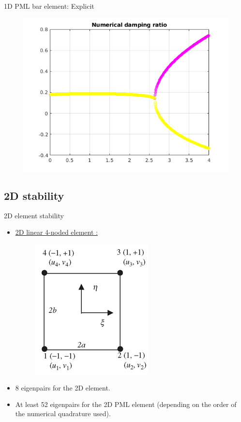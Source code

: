 \begin{frame}{1D PML bar element: Explicit}
\begin{figure}[ht]
\begin{minipage}[b]{0.5\linewidth}
  \end{minipage}%
  \begin{minipage}[b]{0.5\linewidth}
    \centering
    \includegraphics[scale=.35]{images/pml1d-exp-4.png} \\

  \end{minipage} 
\end{figure}
\end{frame}

\subsection{2D stability}
\begin{frame}{2D element stability}
\begin{itemize}
\item \underline{2D linear 4-noded element :}
\begin{figure}
\centering
\includegraphics[width=0.4\linewidth]{images/square2d.png}
\end{figure}
\item 8 eigenpairs for the 2D element.
\item At least 52 eigenpairs for the 2D PML element (depending on the order of the numerical quadrature used).
\end{itemize}
\end{frame}

